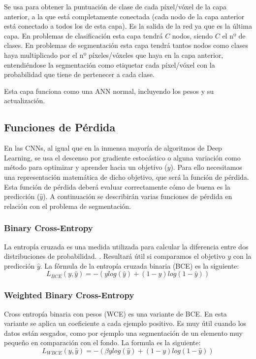 Se usa para obtener la puntuación de clase de cada píxel/vóxel de la capa anterior, a la que está completamente conectada (cada nodo de la capa anterior está conectado a todos los de esta capa). Es la salida de la red ya que es la última capa. En problemas de clasificación esta capa tendrá $C$ nodos, siendo $C$ el nº de clases. En problemas de segmentación esta capa tendrá tantos nodos como clases haya multiplicado por el nº píxeles/vóxeles que haya en la capa anterior, entendiéndose la segmentación como etiquetar cada píxel/vóxel con la probabilidad que tiene de pertenecer a cada clase.

Esta capa funciona como una ANN normal, incluyendo los pesos y su actualización.

\subsection{Funciones de Pérdida}

En las CNNs, al igual que en la inmensa mayoría de algoritmos de Deep Learning, se usa el descenso por gradiente estocástico o alguna variación como método para optimizar y aprender hacia un objetivo ($y$). Para ello necesitamos una representación matemática de dicho objetivo, que será la función de pérdida. Esta función de pérdida deberá evaluar correctamente cómo de buena es la predicción ($\hat{y}$). A continuación se describirán varias funciones de pérdida en relación con el problema de segmentación.

\subsubsection{Binary Cross-Entropy}

La entropía cruzada es una medida utilizada para calcular la diferencia entre dos distribuciones de probabilidad. \cite{Jadon2020}. Resultará útil si comparamos el objetivo $y$ con la predicción $\hat{y}$. La fórmula de la entropía cruzada binaria (BCE) es la siguiente:
\begin{equation}
L_{BCE}(y,\hat{y})=-(y log(\hat{y}) + (1-y)log(1-\hat{y}))
\end{equation}

\subsubsection{Weighted Binary Cross-Entropy}

Cross entropía binaria con pesos (WCE) es una variante de BCE. En esta variante se aplica un coeficiente a cada ejemplo positivo. Es muy útil cuando los datos están sesgados, como por ejemplo una segmentación de un elemento muy pequeño en comparación con el fondo. La formula es la siguiente:
\begin{equation}
L_{WBCE}(y,\hat{y})=-(\beta y log(\hat{y}) + (1-y)log(1-\hat{y}))
\end{equation}

